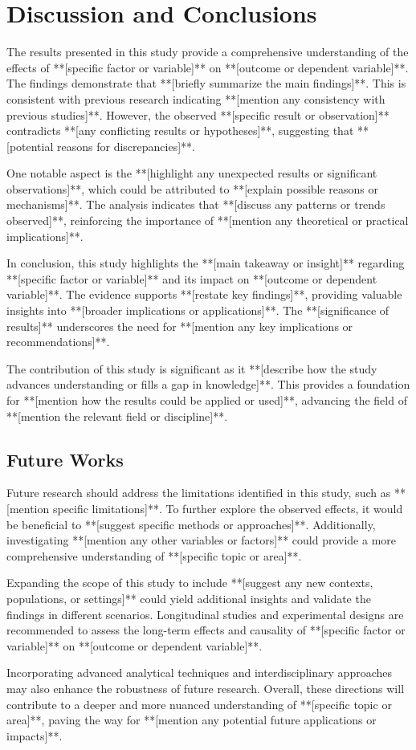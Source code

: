 \documentclass[../Thesis.tex]{subfiles}
\begin{document}
	\section{Discussion and Conclusions}
	\label{sec:discussion_and_conclusions}
	The results presented in this study provide a comprehensive understanding of the effects of **[specific factor or variable]** on **[outcome or dependent variable]**. The findings demonstrate that **[briefly summarize the main findings]**. This is consistent with previous research indicating **[mention any consistency with previous studies]**. However, the observed **[specific result or observation]** contradicts **[any conflicting results or hypotheses]**, suggesting that **[potential reasons for discrepancies]**.
	
	One notable aspect is the **[highlight any unexpected results or significant observations]**, which could be attributed to **[explain possible reasons or mechanisms]**. The analysis indicates that **[discuss any patterns or trends observed]**, reinforcing the importance of **[mention any theoretical or practical implications]**. 
	
	In conclusion, this study highlights the **[main takeaway or insight]** regarding **[specific factor or variable]** and its impact on **[outcome or dependent variable]**. The evidence supports **[restate key findings]**, providing valuable insights into **[broader implications or applications]**. The **[significance of results]** underscores the need for **[mention any key implications or recommendations]**.
	
	The contribution of this study is significant as it **[describe how the study advances understanding or fills a gap in knowledge]**. This provides a foundation for **[mention how the results could be applied or used]**, advancing the field of **[mention the relevant field or discipline]**.
	
	
	\subsection{Future Works}
	Future research should address the limitations identified in this study, such as **[mention specific limitations]**. To further explore the observed effects, it would be beneficial to **[suggest specific methods or approaches]**. Additionally, investigating **[mention any other variables or factors]** could provide a more comprehensive understanding of **[specific topic or area]**.
	
	Expanding the scope of this study to include **[suggest any new contexts, populations, or settings]** could yield additional insights and validate the findings in different scenarios. Longitudinal studies and experimental designs are recommended to assess the long-term effects and causality of **[specific factor or variable]** on **[outcome or dependent variable]**.
	
	Incorporating advanced analytical techniques and interdisciplinary approaches may also enhance the robustness of future research. Overall, these directions will contribute to a deeper and more nuanced understanding of **[specific topic or area]**, paving the way for **[mention any potential future applications or impacts]**.
\end{document}

